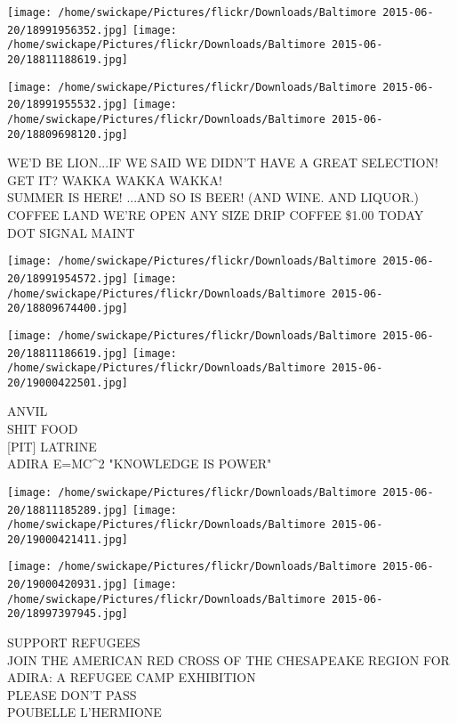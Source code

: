 \documentclass[10pt,letterpaper]{article}
\begin{document}
\texttt{[image: /home/swickape/Pictures/flickr/Downloads/Baltimore 2015-06-20/18991956352.jpg]}
\texttt{[image: /home/swickape/Pictures/flickr/Downloads/Baltimore 2015-06-20/18811188619.jpg]}

\texttt{[image: /home/swickape/Pictures/flickr/Downloads/Baltimore 2015-06-20/18991955532.jpg]}
\texttt{[image: /home/swickape/Pictures/flickr/Downloads/Baltimore 2015-06-20/18809698120.jpg]}

WE'D BE LION...IF WE SAID WE DIDN'T HAVE A GREAT SELECTION!  GET IT?  WAKKA WAKKA WAKKA!\\
SUMMER IS HERE!  ...AND SO IS BEER!  (AND WINE.  AND LIQUOR.)\\
COFFEE LAND WE'RE OPEN ANY SIZE DRIP COFFEE \$1.00 TODAY\\
DOT SIGNAL MAINT\\
\pagebreak

\texttt{[image: /home/swickape/Pictures/flickr/Downloads/Baltimore 2015-06-20/18991954572.jpg]}
\texttt{[image: /home/swickape/Pictures/flickr/Downloads/Baltimore 2015-06-20/18809674400.jpg]}

\texttt{[image: /home/swickape/Pictures/flickr/Downloads/Baltimore 2015-06-20/18811186619.jpg]}
\texttt{[image: /home/swickape/Pictures/flickr/Downloads/Baltimore 2015-06-20/19000422501.jpg]}

ANVIL\\
SHIT FOOD\\
{[}PIT{]} LATRINE\\
ADIRA E=MC\^{}2 "KNOWLEDGE IS POWER"\\
\pagebreak

\texttt{[image: /home/swickape/Pictures/flickr/Downloads/Baltimore 2015-06-20/18811185289.jpg]}
\texttt{[image: /home/swickape/Pictures/flickr/Downloads/Baltimore 2015-06-20/19000421411.jpg]}

\texttt{[image: /home/swickape/Pictures/flickr/Downloads/Baltimore 2015-06-20/19000420931.jpg]}
\texttt{[image: /home/swickape/Pictures/flickr/Downloads/Baltimore 2015-06-20/18997397945.jpg]}

SUPPORT REFUGEES\\
JOIN THE AMERICAN RED CROSS OF THE CHESAPEAKE REGION FOR ADIRA: A REFUGEE CAMP EXHIBITION\\
PLEASE DON'T PASS\\
POUBELLE L'HERMIONE\\
\pagebreak
\end{document}
